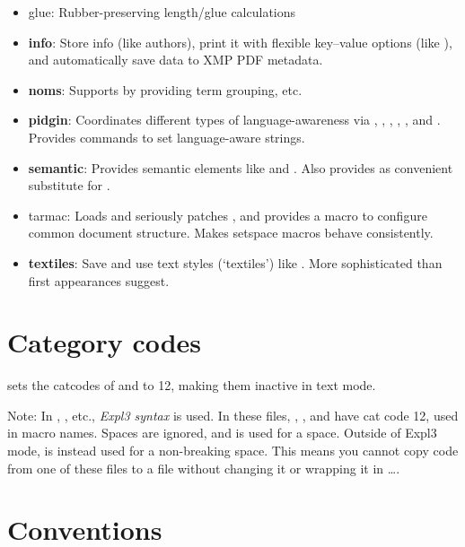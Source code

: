 \begin{BigPages} [hmargin=0.5cm, vmargin=1cm]
\begin{itemize}
    \item glue: Rubber-preserving length/glue calculations
    \item \textbf{info}: Store info (like authors),
          print it with flexible key--value options (like ),
          and automatically save data to \ac{XMP} PDF metadata.
    \item \textbf{noms}: Supports  by providing term grouping, etc.
    \item \textbf{pidgin}: Coordinates different types of language-awareness via ,
          , , , , and .
          Provides commands to set language-aware strings.
    \item \textbf{semantic}: Provides semantic elements like  and .
          Also provides  as convenient substitute for .
    \item tarmac: Loads and seriously patches , and provides a  macro
          to configure common document structure. Makes setspace macros behave consistently.
    \item \textbf{textiles}: Save and use text styles (`textiles') like .
          More sophisticated than first appearances suggest.
\end{itemize}

\section{Category codes}

\Desert sets the catcodes of \code{\^} and \code{\_} to 12, making them inactive in text mode.

Note:
In , , etc., \emph{Expl3 syntax} is used.
In these files, \code{\@}, \code{\_}, and \code{:} have cat code 12, used in macro names.
Spaces are ignored, and \code{\~} is used for a space.
Outside of Expl3 mode, \code{\~} is instead used for a non-breaking space.
This means you cannot copy code from one of these files to a  file
without changing it or wrapping it in  \ldots {}.

\section{Conventions}


\end{BigPages}
